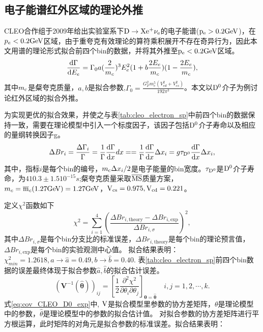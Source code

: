 \subsection{电子能谱红外区域的理论外推}
CLEO合作组于2009年给出实验室系下$\mathrm{D\to X e^+ \nu_e}$的电子能谱($\mathrm{p_{e}>0.2\mathrm{GeV}}$)，在$p_{e}<0.2\mathrm{GeV}$区域，由于重夸克有效理论的算符乘积展开不存在奇异行为，因此本文用谱的理论形式拟合前四个bin的数据，并将其外推至$\mathrm{p_{e}<0.2}\mathrm{GeV}$区域。
\begin{equation}
    \frac{\mathrm{d} \Gamma}{  \mathrm{d} E_{e}}=\Gamma_{0} a (\frac{2}{m_{c}})^3 E_{e}^{2}(1+ b\frac{2E_{e}}{m_{c}})(1-\frac{2E_{e}}{m_{c}}),
    \label{func:fitting function}
    \end{equation}
其中$m_{\mathrm{c}}$是粲夸克质量，$a,b$是拟合参数,$\Gamma_{0}=\frac{G_{F}^2 m_{c}^5(V_{cd}^2+V_{cs}^2)}{192\pi^3}$。本文以$\mathrm{D^{0}}$介子为例讨论红外区域的拟合外推。

为实现更优的拟合效果，并使之与表\ref{tab:cleo_electron_sp}中前四个bin的数据保持一致，需要在理论模型中引入一个标度因子，该因子包括$\mathrm{D^{0}}$介子寿命以及相应的量纲转换因子g。
\begin{equation}
    \Delta Br_{i}= \frac{\Delta \Gamma_{i}}{\Gamma}=\frac{1}{\Gamma} \frac{\mathrm{d}\Gamma}{\mathrm{d}x}dx==\frac{1}{\Gamma} \frac{\mathrm{d}\Gamma}{\mathrm{d}x}\Delta x_{i}=g\tau_{\mathrm{D^{0}}}\frac{\mathrm{d}\Gamma}{\mathrm{d}x}\Delta x_{i}, 
\end{equation}
其中，指标$i$是每个bin的编号，$m_{\mathrm{c}}\Delta x_{i}/2$是电子能量的bin宽度。$\tau_{\mathrm{D^{0}}}$是$\mathrm{D^{0}}$介子寿命，为$410.3\pm1.5 10^{-15}s$;粲夸克质量采取$\overline{\mathrm{MS}}$质量方案，$m_{c}=\overline{\mathrm{m}}_{c}(1.27\mathrm{GeV})=1.27\mathrm{GeV}$，$\mathrm{V_{cs}}=0.975,\mathrm{V_{cd}}=0.221$。

定义$\chi^{2}$函数如下
\begin{equation}
    \chi^{2}=\sum_{i=1}^{4}(\frac{\Delta Br_{i,\text{theory}}-\Delta Br_{i,\text{exp}}}{\Delta Br_{i,\sigma}})^2,
\end{equation}
其中$\Delta Br_{i,\sigma}$是每个bin分支比的标准误差，$\Delta Br_{i,\text{theory}}$是每个bin的理论预言值，$\Delta Br_{i,\text{exp}}$是每个bin的实验观测中心值。
拟合结果表明：$\chi^{2}_{min}=1.2618, a\to \hat{a}=0.49, b\to \hat{b}=0.40$.
表\ref{tab:cleo_electron_sp}前四个bin数据的误差最终体现于拟合参数$\hat{a},\hat{b}$的拟合估计误差。
\begin{equation}
    \left(\boldsymbol{V}^{-1}(\hat{\boldsymbol{\theta}})\right)_{i j}=\left[\frac{1}{2} \frac{\partial^2 \chi^2}{\partial \theta_i \partial \theta_j}\right]_{\boldsymbol{\theta}=\hat{\boldsymbol{\theta}}} \quad i, j=1,2, \cdots, k .
    \label{eq:cov_CLEO_D0_exp}
    \end{equation}
式\eqref{eq:cov_CLEO_D0_exp}中, $\mathrm{V}$是拟合模型里参数的协方差矩阵，$\theta$是理论模型中的参数，$\hat{\theta}$是理论模型中的参数的拟合估计值。 对拟合参数的协方差矩阵进行平方根运算，此时矩阵的对角元是拟合参数的标准误差。拟合结果表明：

